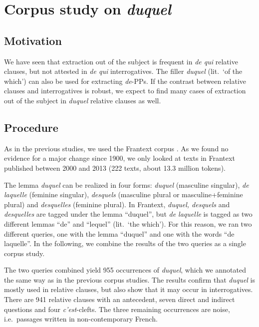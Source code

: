 \section{Corpus study on \emph{duquel}}
\label{ch:duquel}

\subsection{Motivation}

We have seen that extraction out of the subject is frequent in \emph{de qui} relative clauses, but not attested in \emph{de qui} interrogatives. The filler \emph{duquel} (lit.\ `of the which') can also be used for extracting \emph{de}-PPs. If the contrast between relative clauses and interrogatives is robust, we expect to find many cases of extraction out of the subject in \emph{duquel} relative clauses as well. 

\subsection{Procedure}

As in the previous studies, we used the Frantext corpus \citep{Frantext}. As we found no evidence for a major change since 1900, we only looked at texts in Frantext published between 2000 and 2013 (222 texts, about 13.3 million tokens). 

The lemma \emph{duquel} can be realized in four forms: \emph{duquel} (masculine singular), \emph{de laquelle} (feminine singular), \emph{desquels} (masculine plural or masculine+feminine plural) and \emph{desquelles} (feminine plural). In Frantext, \emph{duquel, desquels} and \emph{desquelles} are tagged under the lemma ``duquel'', but \emph{de laquelle} is tagged as two different lemmas ``de'' and ``lequel'' (lit.\ `the which'). For this reason, we ran two different queries, one with the lemma ``duquel'' and one with the words ``de laquelle''. In the following, we combine the results of the two queries as a single corpus study.

The two queries combined yield 955 occurrences of \emph{duquel}, which we annotated the same way as in the previous corpus studies. The results confirm that \emph{duquel} is mostly used in relative clauses, but also show that it may occur in interrogatives. There are 941 relative clauses with an antecedent, seven direct and indirect questions and four \emph{c'est}-clefts. The three remaining occurrences are noise, i.e.\ passages written in non-contemporary French.

